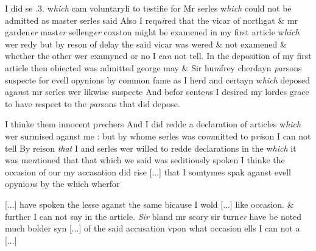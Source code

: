 \documentclass[12pt, a4paper]{book}
\begin{document}
				\marginpar[\vspace{0.5cm}{\textcolor{Gray}{7}}]{}
			 I did se .3. w\textit{hich} cam voluntaryli to testifie for Mr serles w\textit{hich} could not be admitted as master serles said
			 Also I req\textit{ui}red that the vicar of northgat \& mr garden\textit{er} mast\textit{er} selleng\textit{er} coxston might be examened in my first article w\textit{hich} wer redy but by reson of delay the said vicar was wered \& not examened \& whether the other wer examyned or no I ca\textit{n} not tell. 
				\marginpar[\vspace{0.5cm}{\textcolor{Gray}{8}}]{}
			 In the deposition of my first article then obiected was admitted  george may \& Sir hu\textit{m}frey cherdayn \textit{par}sons suspecte for evell opynions by common fame as I herd
			 and certayn w\textit{hich} deposed aga\textit{n}st mr serles wer likwise suspecte And befor sente\textit{n}s I desired my lordes grace to have respect to the \textit{par}sons that did depose.
			 
				\marginpar[\vspace{0.5cm}{\textcolor{Gray}{9}}]{}
			 I thinke them innocent p\textit{re}chers And I did
			 redde a declaration of articles w\textit{hich} wer surmised aganst me : but by whome serles was co\textit{m}mitted to p\textit{ri}son I can not tell 
				\marginpar[\vspace{0.5cm}{\textcolor{Gray}{10}}]{}
			 By reison \textit{that} I and serles wer willed to redde declarations in the  w\textit{hich} it was me\textit{n}tioned that that which we said was seditiously spoken I thinke the occasion of our
			 my accasation did rise 
				[...]
			 that I somtymes spak aganst evell opynio\textit{n}s by the which wherfor
			
               
				[...]
			 have spoken the lesse aganst the same bicause I wold 
				[...]
			 like occasion. \& further I can not say in the article.  
				\marginpar[\vspace{0.5cm}{\textcolor{Gray}{11}}]{}
			 \textit{Sir} bland mr scory sir turn\textit{er} have be noted much bolder syn
				[...]
			 of the said accusation vpon what occasion ells 
			I can not a
				[...]
			
\end{document}
